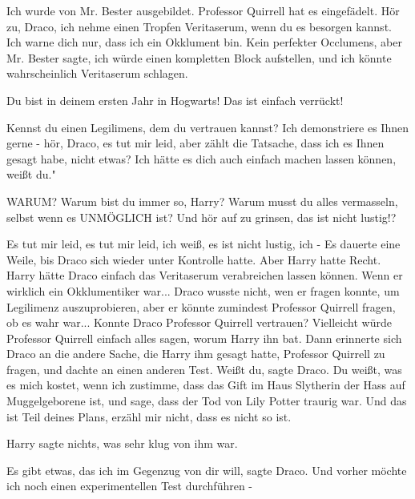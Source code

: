 \glqq Ich wurde von Mr. Bester ausgebildet. Professor Quirrell hat es
eingefädelt. Hör zu, Draco, ich nehme einen Tropfen Veritaserum, wenn du es
besorgen kannst. Ich warne dich nur, dass ich ein Okklument bin. Kein perfekter
Occlumens, aber Mr. Bester sagte, ich würde einen kompletten Block aufstellen,
und ich könnte wahrscheinlich Veritaserum schlagen.\grqq{}

\glqq Du bist in deinem ersten Jahr in Hogwarts! Das ist einfach
verrückt!\grqq{}

\glqq Kennst du einen Legilimens, dem du vertrauen kannst? Ich demonstriere es
Ihnen gerne - hör, Draco, es tut mir leid, aber zählt die Tatsache, dass ich es
Ihnen gesagt habe, nicht etwas? Ich hätte es dich auch einfach machen lassen
können, weißt du."

\glqq WARUM? Warum bist du immer so, Harry? Warum musst du alles vermasseln,
selbst wenn es UNMÖGLICH ist? Und hör auf zu grinsen, das ist nicht
lustig!?\grqq{}

\glqq Es tut mir leid, es tut mir leid, ich weiß, es ist nicht lustig, ich
-\grqq{} Es dauerte eine Weile, bis Draco sich wieder unter Kontrolle hatte.
Aber Harry hatte Recht. Harry hätte Draco einfach das Veritaserum verabreichen
lassen können. Wenn er wirklich ein Okklumentiker war... Draco wusste nicht, wen
er fragen konnte, um Legilimenz auszuprobieren, aber er könnte zumindest
Professor Quirrell fragen, ob es wahr war... Konnte Draco Professor Quirrell
vertrauen? Vielleicht würde Professor Quirrell einfach alles sagen, worum Harry
ihn bat. Dann erinnerte sich Draco an die andere Sache, die Harry ihm gesagt
hatte, Professor Quirrell zu fragen, und dachte an einen anderen Test. \glqq
Weißt du\grqq{}, sagte Draco. \glqq Du weißt, was es mich kostet, wenn ich
zustimme, dass das Gift im Haus Slytherin der Hass auf Muggelgeborene ist, und
sage, dass der Tod von Lily Potter traurig war. Und das ist Teil deines Plans,
erzähl mir nicht, dass es nicht so ist.\grqq{}

Harry sagte nichts, was sehr klug von ihm war.

\glqq Es gibt etwas, das ich im Gegenzug von dir will\grqq{}, sagte Draco. \glqq
Und vorher möchte ich noch einen experimentellen Test durchführen -\grqq{}

